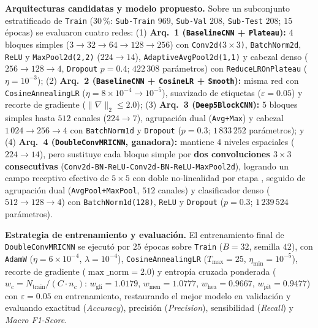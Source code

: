 \documentclass[letterpaper, 10 pt, conference]{ieeeconf}
\begin{document}
\textbf{Arquitecturas candidatas y modelo propuesto.} 
Sobre un subconjunto estratificado de \texttt{Train} (\(30\,\%\): \texttt{Sub-Train} \(969\), \texttt{Sub-Val} \(208\), \texttt{Sub-Test} \(208\); \(15\) épocas) se evaluaron cuatro redes: 
(1) \textbf{Arq.~1 (\texttt{BaselineCNN} + \texttt{Plateau}):} \(4\) bloques simples (\(3\to 32\to 64\to 128\to 256\)) con \texttt{Conv2d(\(3\times 3\))}, \texttt{BatchNorm2d}, \texttt{ReLU} y \texttt{MaxPool2d(2,2)} (\(224\to 14\)), \texttt{AdaptiveAvgPool2d(1,1)} y cabezal denso (\(256\to 128\to 4\), \texttt{Dropout} \(p=0.4\); \(422\,308\) parámetros) con \texttt{ReduceLROnPlateau} (\(\eta=10^{-3}\)); 
(2) \textbf{Arq.~2 (\texttt{BaselineCNN} + \texttt{CosineLR} + \texttt{Smooth}):} misma red con \texttt{CosineAnnealingLR} (\(\eta=8\times 10^{-4}\to 10^{-5}\)), suavizado de etiquetas (\(\varepsilon=0.05\)) \cite{c5} y recorte de gradiente (\(\|\nabla\|_2 \le 2.0\)); 
(3) \textbf{Arq.~3 (\texttt{Deep5BlockCNN}):} \(5\) bloques simples hasta \(512\) canales (\(224\to 7\)), agrupación dual (\texttt{Avg+Max}) y cabezal \(1\,024\to 256\to 4\) con \texttt{BatchNorm1d} y \texttt{Dropout} (\(p=0.3\); \(1\,833\,252\) parámetros); 
y (4) \textbf{Arq.~4 (\texttt{DoubleConvMRICNN}, ganadora):} mantiene \(4\) niveles espaciales (\(224\to 14\)), pero sustituye cada bloque simple por \textbf{dos convoluciones \(3\times 3\) consecutivas} (\texttt{Conv2d-\allowbreak BN-\allowbreak ReLU-\allowbreak Conv2d-\allowbreak BN-\allowbreak ReLU-\allowbreak MaxPool2d}), logrando un campo receptivo efectivo de \(5\times 5\) con doble no-linealidad por etapa \cite{c4}, seguido de agrupación dual (\texttt{AvgPool+MaxPool}, \(512\) canales) y clasificador denso (\(512\to 128\to 4\)) con \texttt{BatchNorm1d(128)}, \texttt{ReLU} y \texttt{Dropout} (\(p=0.3\); \(1\,239\,524\) parámetros).

\textbf{Estrategia de entrenamiento y evaluación.}
El entrenamiento final de \texttt{DoubleConvMRICNN} se ejecutó por \(25\) épocas sobre \texttt{Train} (\(B = 32\), semilla \(42\)), con \texttt{AdamW} (\(\eta = 6\times 10^{-4}\), \(\lambda = 10^{-4}\)), \texttt{CosineAnnealingLR} (\(T_{\max}=25\), \(\eta_{\min}=10^{-5}\)), recorte de gradiente (\(\max\_\text{norm}=2.0\)) y entropía cruzada ponderada (\(w_c = N_{\text{train}} / (C \cdot n_c)\): \(w_{\text{gli}} = 1.0179\), \(w_{\text{men}} = 1.0777\), \(w_{\text{hea}} = 0.9667\), \(w_{\text{pit}} = 0.9477\)) con \(\varepsilon=0.05\) en entrenamiento, restaurando el mejor modelo en validación y evaluando exactitud (\textit{Accuracy}), precisión (\textit{Precision}), sensibilidad (\textit{Recall}) y \textit{Macro F1-Score}.
\end{document}
